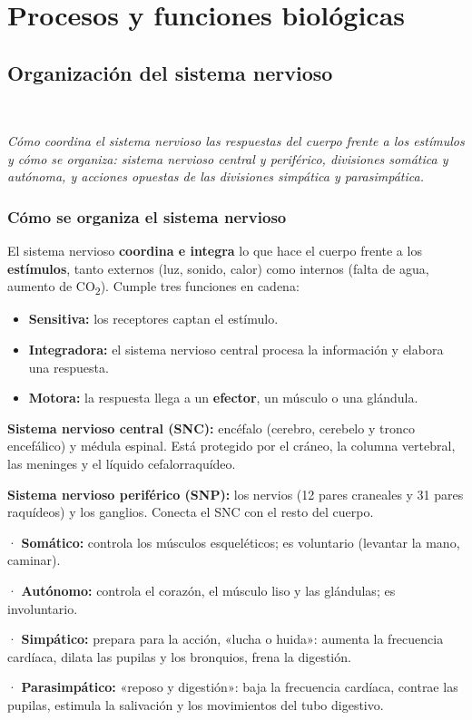 \chapter{Procesos y funciones biológicas}
\section[Organización del sistema nervioso]{Organización del sistema nervioso}
\modcomun\ \ {\color{gris}\itshape Cómo coordina el sistema nervioso las respuestas del cuerpo frente a los estímulos y cómo se organiza: sistema nervioso central y periférico, divisiones somática y autónoma, y acciones opuestas de las divisiones simpática y parasimpática.\par}
\subsection{Cómo se organiza el sistema nervioso}
El sistema nervioso \textbf{coordina e integra} lo que hace el cuerpo frente a los \textbf{estímulos}, tanto externos (luz, sonido, calor) como internos (falta de agua, aumento de CO\textsubscript{2}). Cumple tres funciones en cadena:

 
\begin{itemize}
  \item \textbf{Sensitiva:} los receptores captan el estímulo.
  \item \textbf{Integradora:} el sistema nervioso central procesa la información y elabora una respuesta.
  \item \textbf{Motora:} la respuesta llega a un \textbf{efector}, un músculo o una glándula.
\end{itemize}
 

\textbf{Sistema nervioso central (SNC):} encéfalo (cerebro, cerebelo y tronco encefálico) y médula espinal. Está protegido por el cráneo, la columna vertebral, las meninges y el líquido cefalorraquídeo.

 

\textbf{Sistema nervioso periférico (SNP):} los nervios (12 pares craneales y 31 pares raquídeos) y los ganglios. Conecta el SNC con el resto del cuerpo.

  
\begin{clave} · \textbf{Somático:} controla los músculos esqueléticos; es voluntario (levantar la mano, caminar).\par · \textbf{Autónomo:} controla el corazón, el músculo liso y las glándulas; es involuntario.\par · \textbf{Simpático:} prepara para la acción, «lucha o huida»: aumenta la frecuencia cardíaca, dilata las pupilas y los bronquios, frena la digestión.\par · \textbf{Parasimpático:} «reposo y digestión»: baja la frecuencia cardíaca, contrae las pupilas, estimula la salivación y los movimientos del tubo digestivo.\end{clave}
  
